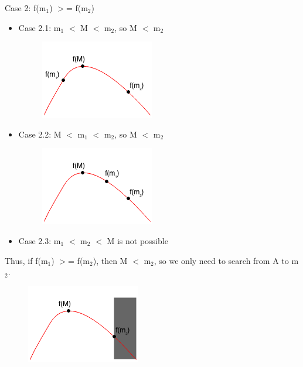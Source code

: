 \documentclass[11pt,oneside]{book}
\makeatletter
\def\maxwidth#1{\ifdim\Gin@nat@width>#1 #1\else\Gin@nat@width\fi}
\makeatother
\begin{document}
Case 2: f(m$_{1}$) $>$= f(m$_{2}$)

\begin{itemize}
\item Case 2.1: m$_{1}$ $<$ M $<$ m$_{2}$, so M $<$ m$_{2}$

\vspace{5px}\begin{figure}[H]\centering
        \includegraphics[width=0.66\maxwidth{\textwidth}]{ternarycase21.png}
        \end{figure}
\item Case 2.2: M $<$ m$_{1}$ $<$ m$_{2}$, so M $<$ m$_{2}$

\vspace{5px}\begin{figure}[H]\centering
        \includegraphics[width=0.66\maxwidth{\textwidth}]{ternarycase22.png}
        \end{figure}
\item Case 2.3: m$_{1}$ $<$ m$_{2}$ $<$ M is not possible
\end{itemize}

Thus, if f(m$_{1}$) $>$= f(m$_{2}$), then M $<$ m$_{2}$, so we only need to search from A to m$_{2}$.

\vspace{5px}\begin{figure}[H]\centering
        \includegraphics[width=0.66\maxwidth{\textwidth}]{ternarycase2.png}
        \end{figure}
\end{document}

